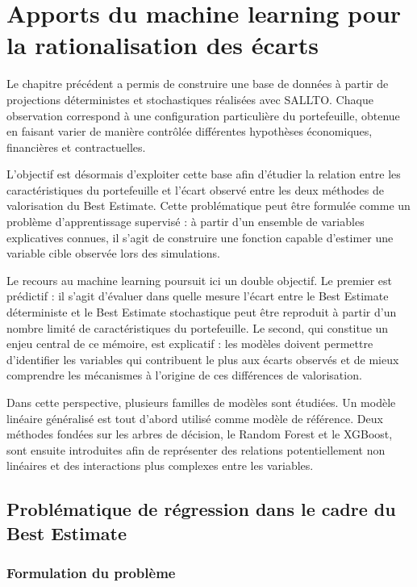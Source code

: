 \chapter{Apports du machine learning pour la rationalisation des écarts}

Le chapitre précédent a permis de construire une base de données à partir de projections déterministes et stochastiques réalisées avec SALLTO. Chaque observation correspond à une configuration particulière du portefeuille, obtenue en faisant varier de manière contrôlée différentes hypothèses économiques, financières et contractuelles.

L'objectif est désormais d'exploiter cette base afin d'étudier la relation entre les caractéristiques du portefeuille et l'écart observé entre les deux méthodes de valorisation du Best Estimate. Cette problématique peut être formulée comme un problème d'apprentissage supervisé : à partir d'un ensemble de variables explicatives connues, il s'agit de construire une fonction capable d'estimer une variable cible observée lors des simulations.

Le recours au machine learning poursuit ici un double objectif. Le premier est prédictif : il s'agit d'évaluer dans quelle mesure l'écart entre le Best Estimate déterministe et le Best Estimate stochastique peut être reproduit à partir d'un nombre limité de caractéristiques du portefeuille. Le second, qui constitue un enjeu central de ce mémoire, est explicatif : les modèles doivent permettre d'identifier les variables qui contribuent le plus aux écarts observés et de mieux comprendre les mécanismes à l'origine de ces différences de valorisation.

Dans cette perspective, plusieurs familles de modèles sont étudiées. Un modèle linéaire généralisé est tout d'abord utilisé comme modèle de référence. Deux méthodes fondées sur les arbres de décision, le Random Forest et le XGBoost, sont ensuite introduites afin de représenter des relations potentiellement non linéaires et des interactions plus complexes entre les variables.

\section{Problématique de régression dans le cadre du Best Estimate}

\subsection{Formulation du problème}

